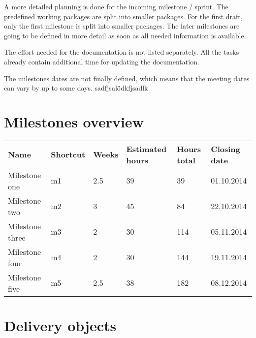 A more detailed planning is done for the incoming milestone / sprint. The predefined working packages are split into smaller packages. For the first draft, only the first milestone is split into smaller packages. The later milestones are going to be defined in more detail as soon as all needed information is available. 

The effort needed for the documentation is not listed separately. All the tasks already contain additional time for updating the documentation.

The milestones dates are not finally defined, which means that the meeting dates can vary by up to some days. sadfjsalödkfjsadlk

\section{Milestones overview}

	\begin{tabular}{ | p{3cm} | p{2cm} | p{2cm} | p{2cm} | p{2cm} | p{2cm} |}
	\hline
	\textbf{Name} & \textbf{Shortcut} & \textbf{Weeks} & \textbf{Estimated hours} & \textbf{Hours  \mbox{total}} & \textbf{Closing date} \\ \hline
	Milestone one & m1 & 2.5 & 39 & 39 & 01.10.2014 \\
	Milestone two & m2 & 3 & 45 & 84 & 22.10.2014 \\
	Milestone three & m3 & 2 & 30 & 114 & 05.11.2014 \\
	Milestone four & m4 & 2 & 30 & 144 & 19.11.2014 \\
	Milestone five & m5 & 2.5 & 38 & 182 & 08.12.2014 \\
	\hline
	\end{tabular}


\section{Delivery objects}

